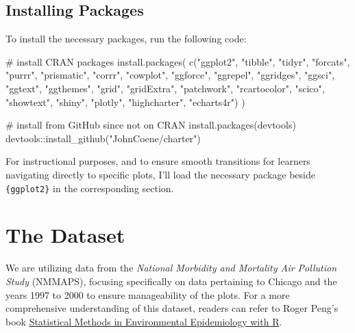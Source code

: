 \documentclass[
  letterpaper,
]{scrbook}
\newenvironment{Shaded}{\begin{snugshade}}{\end{snugshade}}
\newcommand{\CommentTok}[1]{\textcolor[rgb]{0.37,0.37,0.37}{#1}}
\newcommand{\FunctionTok}[1]{\textcolor[rgb]{0.28,0.35,0.67}{#1}}
\newcommand{\NormalTok}[1]{\textcolor[rgb]{0.00,0.23,0.31}{#1}}
\newcommand{\SpecialCharTok}[1]{\textcolor[rgb]{0.37,0.37,0.37}{#1}}
\newcommand{\StringTok}[1]{\textcolor[rgb]{0.13,0.47,0.30}{#1}}
\begin{document}
\section{Installing Packages}\label{installing-packages}

To install the necessary packages, run the following code:

\begin{Shaded}
\begin{Highlighting}[]
\CommentTok{\# install CRAN packages}
\FunctionTok{install.packages}\NormalTok{(}
  \FunctionTok{c}\NormalTok{(}\StringTok{"ggplot2"}\NormalTok{, }\StringTok{"tibble"}\NormalTok{, }\StringTok{"tidyr"}\NormalTok{, }\StringTok{"forcats"}\NormalTok{, }\StringTok{"purrr"}\NormalTok{, }\StringTok{"prismatic"}\NormalTok{, }\StringTok{"corrr"}\NormalTok{, }
    \StringTok{"cowplot"}\NormalTok{, }\StringTok{"ggforce"}\NormalTok{, }\StringTok{"ggrepel"}\NormalTok{, }\StringTok{"ggridges"}\NormalTok{, }\StringTok{"ggsci"}\NormalTok{, }\StringTok{"ggtext"}\NormalTok{, }\StringTok{"ggthemes"}\NormalTok{, }
    \StringTok{"grid"}\NormalTok{, }\StringTok{"gridExtra"}\NormalTok{, }\StringTok{"patchwork"}\NormalTok{, }\StringTok{"rcartocolor"}\NormalTok{, }\StringTok{"scico"}\NormalTok{, }\StringTok{"showtext"}\NormalTok{, }
    \StringTok{"shiny"}\NormalTok{, }\StringTok{"plotly"}\NormalTok{, }\StringTok{"highcharter"}\NormalTok{, }\StringTok{"echarts4r"}\NormalTok{)}
\NormalTok{)}

\CommentTok{\# install from GitHub since not on CRAN}
\FunctionTok{install.packages}\NormalTok{(devtools)}
\NormalTok{devtools}\SpecialCharTok{::}\FunctionTok{install\_github}\NormalTok{(}\StringTok{"JohnCoene/charter"}\NormalTok{)}
\end{Highlighting}
\end{Shaded}

For instructional purposes, and to ensure smooth transitions for
learners navigating directly to specific plots, I'll load the necessary
package beside \texttt{\{ggplot2\}} in the corresponding section.


\chapter{The Dataset}\label{data}

We are utilizing data from the \emph{National Morbidity and Mortality
Air Pollution Study} (NMMAPS), focusing specifically on data pertaining
to Chicago and the years 1997 to 2000 to ensure manageability of the
plots. For a more comprehensive understanding of this dataset, readers
can refer to Roger Peng's book
\href{http://www.springer.com/de/book/9780387781662}{Statistical Methods
in Environmental Epidemiology with R}.
\end{document}
